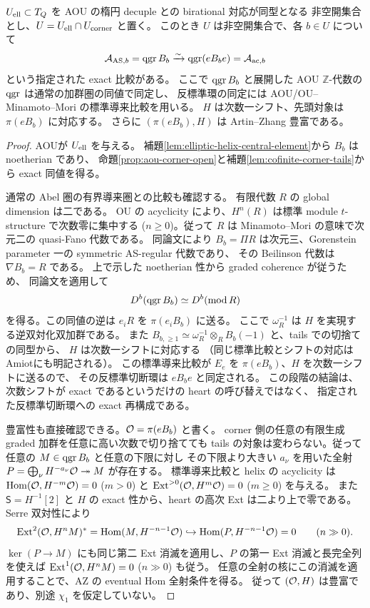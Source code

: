 \begin{corollary}
\label{cor:actual-aou-corner-heart}
$U_{\rm ell}\subset T_Q$ を AOU の楕円 decuple との birational 対応が同型となる
非空開集合とし、$U=U_{\rm ell}\cap U_{\rm corner}$ と置く。
このとき $U$ は非空開集合で、各 $b\in U$ について
\[
 \mathcal A_{{\rm AS},b}=\operatorname{qgr} B_b
 \xrightarrow{\sim}\operatorname{qgr}(eB_be)=\mathcal A_{{\rm ac},b}
\]
という指定された exact 比較がある。
ここで $\operatorname{qgr} B_b$ と展開した AOU $\mathbb Z$-代数の $\operatorname{qgr}$ は通常の加群圏の同値で同定し、
反標準環の同定には AOU/OU--Minamoto--Mori の標準導来比較を用いる。
$H$ は次数一シフト、先頭対象は $\pi(eB_b)$ に対応する。
さらに $(\pi(eB_b),H)$ は Artin--Zhang 豊富である。
\end{corollary}
\begin{proof}
AOU\cite[Theorem 1.1]{AOU}が $U_{\rm ell}$ を与える。
補題\ref{lem:elliptic-helix-central-element}から $B_b$ は noetherian であり、
命題\ref{prop:aou-corner-open}と補題\ref{lem:cofinite-corner-tails}から exact 同値を得る。

通常の Abel 圏の有界導来圏との比較も確認する。
有限代数 $R$ の global dimension は二である。
OU の acyclicity により、$H^n(R)$ は標準 module $t$-structure で次数零に集中する
($n\ge0$)。従って $R$ は Minamoto--Mori の意味で次元二の quasi-Fano 代数である。
同論文\cite[Corollary 4.13]{MM}により
$B_b=\Pi R$ は次元三、Gorenstein parameter 一の symmetric AS-regular 代数であり、
その Beilinson 代数は $\nabla B_b=R$ である。
上で示した noetherian 性から graded coherence が従うため、
同論文\cite[Theorem 4.14]{MM}を適用して
\[
 D^b(\operatorname{qgr} B_b)\simeq D^b(\operatorname{mod}R)
\]
を得る。この同値の逆は $e_iR$ を $\pi(e_iB_b)$ に送る。
ここで $\omega_R^{-1}$ は $H$ を実現する逆双対化双加群である。
また $B_{b,\ge1}\simeq\omega_R^{-1}\otimes_R B_b(-1)$ と、tails での切捨ての同型から、
$H$ は次数一シフトに対応する
（同じ標準比較とシフトの対応は Amiot\cite[Theorem 2.3]{AmiotCorners}にも明記される）。
この標準導来比較が $E_e$ を $\pi(eB_b)$、$H$ を次数一シフトに送るので、
その反標準切断環は $eB_be$ と同定される。
この段階の結論は、次数シフトが exact であるというだけの heart の呼び替えではなく、
指定された反標準切断環への exact 再構成である。

豊富性も直接確認できる。$\mathcal O=\pi(eB_b)$ と書く。
corner 側の任意の有限生成 graded 加群を任意に高い次数で切り捨てても
tails の対象は変わらない。従って任意の $M\in\operatorname{qgr} B_b$ と任意の下限に対し
その下限より大きい $a_\nu$ を用いた全射
$P=\bigoplus_\nu H^{-a_\nu}\mathcal O\twoheadrightarrow M$ が存在する。
標準導来比較と helix の acyclicity は
$\operatorname{Hom}(\mathcal O,H^{-m}\mathcal O)=0$ ($m>0$) と
$\operatorname{Ext}^{>0}(\mathcal O,H^m\mathcal O)=0$ ($m\ge0$) を与える。
また $\mathsf S=H^{-1}[2]$ と $H$ の exact 性から、heart の高次 Ext は二より上で零である。
Serre 双対性により
\[
 \operatorname{Ext}^2(\mathcal O,H^nM)^*
 =\operatorname{Hom}(M,H^{-n-1}\mathcal O)
 \hookrightarrow\operatorname{Hom}(P,H^{-n-1}\mathcal O)=0\qquad(n\gg0).
\]
$\ker(P\to M)$ にも同じ第二 Ext 消滅を適用し、$P$ の第一 Ext 消滅と長完全列を使えば
$\operatorname{Ext}^1(\mathcal O,H^nM)=0$ ($n\gg0$) も従う。
任意の全射の核にこの消滅を適用することで、AZ の eventual Hom 全射条件を得る。
従って $(\mathcal O,H)$ は豊富であり、別途 $\chi_1$ を仮定していない。
\end{proof}


